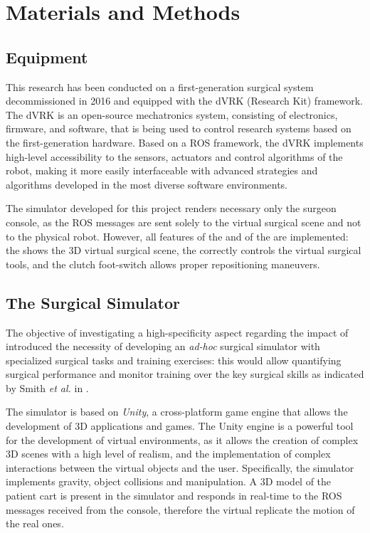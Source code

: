 \documentclass[../main.tex]{subfiles}
\begin{document}
\chapter{Materials and Methods}

\section{Equipment}
This research has been conducted on a first-generation \davinci surgical system decommissioned in 2016 and equipped with the dVRK (\davinci Research Kit) framework. The dVRK \cite{Kazanzides2014} is an open-source mechatronics system, consisting of electronics, firmware, and software, that is being used to control research systems based on the first-generation \davinci hardware. Based on a ROS \cite{Quigley2009} framework, the dVRK implements high-level accessibility to the sensors, actuators and control algorithms of the \davinci robot, making it more easily interfaceable with advanced strategies and algorithms developed in the most diverse software environments.

The simulator developed for this project renders necessary only the surgeon console, as the ROS messages are sent solely to the virtual surgical scene and not to the physical robot. However, all features of the \psms and of the \ecm are implemented: the \hrsv shows the 3D virtual surgical scene, the \mtms correctly controls the virtual surgical tools, and the clutch foot-switch allows proper repositioning maneuvers. 

\section{The Surgical Simulator} 
The objective of investigating a high-specificity aspect regarding the impact of \vfs introduced the necessity of developing an \textit{ad-hoc} surgical simulator with specialized surgical tasks and training exercises: this would allow quantifying surgical performance and monitor training over the key surgical skills as indicated by Smith \textit{et al.} in \cite{Smith2014}. 

The simulator is based on \textit{Unity}, a cross-platform game engine that allows the development of 3D applications and games. The Unity engine is a powerful tool for the development of virtual environments, as it allows the creation of complex 3D scenes with a high level of realism, and the implementation of complex interactions between the virtual objects and the user. Specifically, the simulator implements gravity, object collisions and manipulation. A 3D model of the \davinci patient cart is present in the simulator and responds in real-time to the ROS messages received from the console, therefore the virtual \psms replicate the motion of the real ones. 
\end{document}
